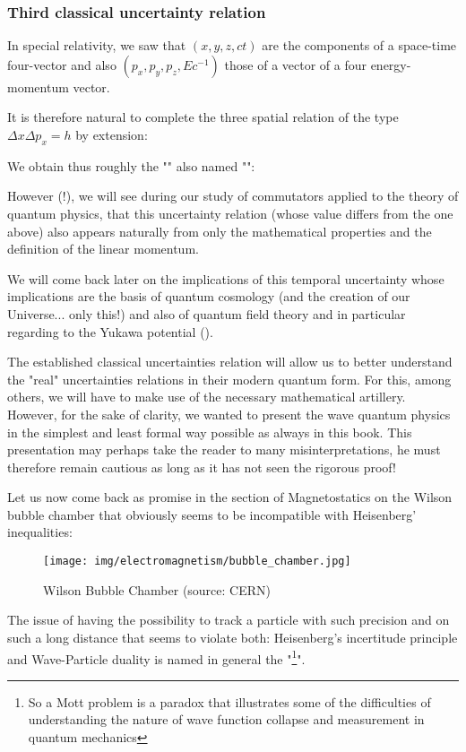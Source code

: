 	\subsubsection{Third classical uncertainty relation}
	In special relativity, we saw that $(x, y, z, ct)$ are the components of a space-time four-vector and also $(p_x,p_y,p_z,Ec^{-1})$ those of a vector of a four energy-momentum vector.

	It is therefore natural to complete the three spatial relation of the type $\Delta x \Delta p_x=h$ by extension:
	
	We obtain thus roughly the "" also named "":
	
	However (!), we will see during our study of commutators applied to the theory of quantum physics, that this uncertainty relation (whose value differs from the one above) also appears naturally from only the mathematical properties and the definition of the linear momentum.
	\begin{tcolorbox}[title=Remark,colframe=black,arc=10pt]
	We will come back later on the implications of this temporal uncertainty whose implications are the basis of quantum cosmology (and the creation of our Universe... only this!) and also of quantum field theory and in particular regarding to the Yukawa potential ().
	\end{tcolorbox}
	The established classical uncertainties relation will allow us to better understand the "real" uncertainties relations in their modern quantum form. For this, among others, we will have to make use of the necessary mathematical artillery. However, for the sake of clarity, we wanted to present the wave quantum physics in the simplest and least formal way possible as always in this book. This presentation may perhaps take the reader to many misinterpretations, he must therefore remain cautious as long as it has not seen the rigorous proof!
	
	Let us now come back as promise in the section of Magnetostatics on the Wilson bubble chamber that obviously seems to be incompatible with Heisenberg' inequalities: 
	\begin{figure}[H]
		\centering
		\texttt{[image: img/electromagnetism/bubble\_chamber.jpg]}
		\caption[Wilson Bubble Chamber]{Wilson Bubble Chamber (source: CERN)}
	\end{figure}
	The issue of having the possibility to track a particle with such precision and on such a long distance that seems to violate both: Heisenberg's incertitude principle and Wave-Particle duality is named in general the "\footnote{So a Mott problem is a paradox that illustrates some of the difficulties of understanding the nature of wave function collapse and measurement in quantum mechanics}".

